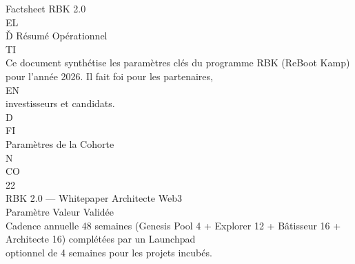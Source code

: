Factsheet RBK 2.0\\
\vspace{0.5em}
\vspace{0.5em}
\vspace{0.5em}
\vspace{0.5em}
EL\\
Ď Résumé Opérationnel\\
\vspace{0.5em}
\vspace{0.5em}
\vspace{0.5em}
\vspace{0.5em}
TI\\
Ce document synthétise les paramètres clés du programme RBK (ReBoot Kamp) pour l’année 2026. Il fait foi pour les partenaires,\\
\vspace{0.5em}
\vspace{0.5em}
\vspace{0.5em}
\vspace{0.5em}
EN\\
investisseurs et candidats.\\
\vspace{0.5em}
\vspace{0.5em}
\vspace{0.5em}
\vspace{0.5em}
D\\
FI\\
Paramètres de la Cohorte\\
\vspace{0.5em}
N\\
CO\\
\vspace{0.5em}
\vspace{0.5em}
\vspace{0.5em}
\vspace{0.5em}
22\\
RBK 2.0 — Whitepaper Architecte Web3\\
\vspace{0.5em}
\vspace{0.5em}
\vspace{0.5em}
\vspace{0.5em}
Paramètre                   Valeur Validée\\
\vspace{0.5em}
Cadence annuelle            48 semaines (Genesis Pool 4 + Explorer 12 + Bâtisseur 16 + Architecte 16) complétées par un Launchpad\\
optionnel de 4 semaines pour les projets incubés.\\
